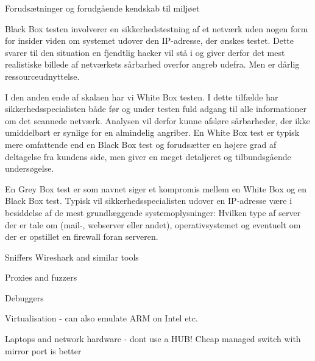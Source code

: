 \documentclass[Screen16to9,17pt]{foils}
\begin{document}
\begin{list2}
\item Forudsætninger og forudgående kendskab til miljøet
\item Black Box testen involverer en sikkerhedstestning af et netværk uden
nogen form for insider viden om systemet udover den IP-adresse, der
ønskes testet. Dette svarer til den situation en fjendtlig hacker vil
stå i og giver derfor det mest realistiske billede af netværkets
sårbarhed overfor angreb udefra. Men er dårlig ressourceudnyttelse.
\item I den anden ende  af skalaen har vi White Box testen. I dette tilfælde
har sikkerhedsspecialisten både før og under testen fuld adgang til
alle informationer om det scannede netværk. Analysen vil derfor kunne
afsløre sårbarheder, der ikke umiddelbart er synlige for en almindelig
angriber. En White Box test er typisk mere omfattende end en Black Box
test og forudsætter en højere grad af deltagelse fra kundens side, men
giver en meget detaljeret og tilbundsgående undersøgelse.

\item En Grey Box test er som navnet siger et kompromis mellem en White Box
og en Black Box test. Typisk vil sikkerhedsspecialisten udover en
IP-adresse være i besiddelse af de mest grundlæggende
systemoplysninger: Hvilken type af server der er tale om (mail-,
webserver eller andet), operativsystemet og eventuelt om der er
opstillet en firewall foran serveren.
\end{list2}




\begin{list2}
\item Sniffers Wireshark and similar tools
\item Proxies and fuzzers
\item Debuggers
\item Virtualisation - can also emulate ARM on Intel etc.
\item Laptops and network hardware - dont use a HUB! Cheap managed switch with mirror port is better
\end{list2}



\end{document}
